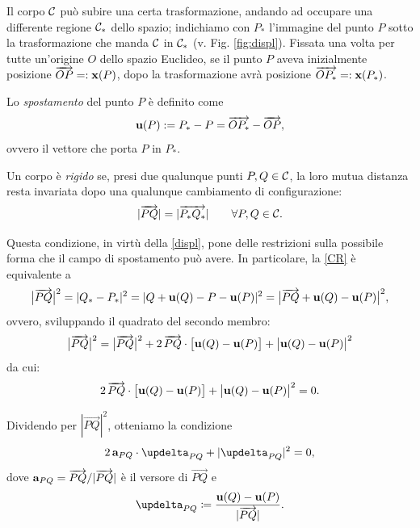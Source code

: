 Il corpo $\mathcal{C}$ può subire una certa trasformazione, andando ad occupare una differente regione $\mathcal{C}_*$ dello spazio; indichiamo con $P_*$ l'immagine del punto $P$ sotto la trasformazione che manda $\mathcal{C}$ in $\mathcal{C}_*$ (v. Fig. \ref{fig:displ}). Fissata una volta per tutte un'origine $O$ dello spazio Euclideo, se il punto $P$ aveva inizialmente posizione $\overrightarrow{OP}=:\mathbf{x}(P)$, dopo la trasformazione avrà posizione $\overrightarrow{OP_*}=:\mathbf{x}(P_*)$. 





Lo \textit{spostamento} del punto $P$ è definito come
\begin{equation}\label{displ}
	\mathbf{u}(P):=P_*-P=\overrightarrow{OP_*}-\overrightarrow{OP},
\end{equation}
ovvero il vettore che porta $P$ in $P_*$. 

Un corpo è \textit{rigido} se, presi due qualunque punti $P, Q \in\mathcal{C}$, la loro mutua distanza resta invariata dopo una qualunque cambiamento di configurazione:
\begin{equation}\label{CR}
	|\overrightarrow{PQ}|=|\overrightarrow{P_*Q_*}| \qquad \forall P,Q\in\mathcal{C}.
\end{equation}

Questa condizione, in virtù della \eqref{displ}, pone delle restrizioni sulla possibile forma che il campo di spostamento può avere. In particolare, la  \eqref{CR} 
è equivalente a 
\begin{equation}\label{eq:rigidita_esatta}
	\bigl|\overrightarrow{PQ}\bigr|^2=|Q_*-P_*|^2=|Q+\mathbf{u}(Q)-P-\mathbf{u}(P)|^2=\bigl|\overrightarrow{PQ} + \mathbf{u}(Q) - \mathbf{u}(P)\bigr|^2,
\end{equation}
ovvero, sviluppando il quadrato del secondo membro:
\begin{equation}\label{eq:rigidita_sviluppo}
	\bigl|\overrightarrow{PQ}\bigr|^2=\bigl|\overrightarrow{PQ}\bigr|^2 
	+ 2\,\overrightarrow{PQ} \cdot \bigl[\mathbf{u}(Q) - \mathbf{u}(P)\bigr]
	+ \bigl|\mathbf{u}(Q) - \mathbf{u}(P)\bigr|^2
\end{equation}
da cui:
\begin{equation}\label{eq:rigidita_semplificata}
	2\,\overrightarrow{PQ} \cdot \bigl[\mathbf{u}(Q) - \mathbf{u}(P)\bigr]
	+ \bigl|\mathbf{u}(Q) - \mathbf{u}(P)\bigr|^2 = 0.
\end{equation}

Dividendo per $|\overrightarrow{PQ}|^2$, otteniamo la condizione
\begin{equation}\label{eq:rigidita_adim}
	2\,\ab_{PQ} \cdot \bm{\updelta}_{PQ} + |\bm{\updelta}_{PQ}|^2 = 0,
\end{equation}
dove $\mathbf{a}_{PQ} = \overrightarrow{PQ}/|\overrightarrow{PQ}|$ è il versore di $\overrightarrow{PQ}$ e
\begin{equation}
	\bm{\updelta}_{PQ} \coloneqq \frac{\ub(Q)-\ub(P)}{|\overrightarrow{PQ}|}.
\end{equation}

